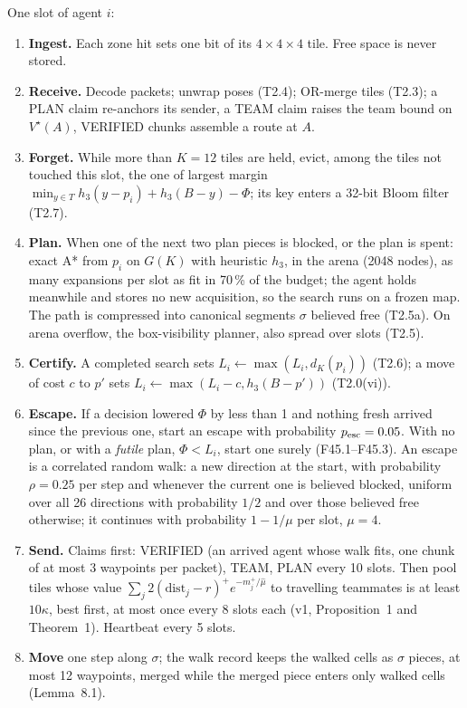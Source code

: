 \documentclass[11pt,a4paper]{article}
\newcommand{\Vs}{V^\star}
\begin{document}
One slot of agent $i$:
\begin{enumerate}\itemsep2pt
\item \textbf{Ingest.} Each zone hit sets one bit of its $4\times4\times4$ tile. Free space is never stored.
\item \textbf{Receive.} Decode packets; unwrap poses (T2.4); OR-merge tiles (T2.3); a PLAN claim re-anchors its
sender, a TEAM claim raises the team bound on $\Vs(A)$, VERIFIED chunks assemble a route at $A$.
\item \textbf{Forget.} While more than $K=12$ tiles are held, evict, among the tiles not touched this slot, the one of
largest margin $\min_{y\in T}h_3(y-p_i)+h_3(B-y)-\Phi$; its key enters a 32-bit Bloom filter (T2.7).
\item \textbf{Plan.} When one of the next two plan pieces is blocked, or the plan is spent: exact A* from $p_i$ on
$G(K)$ with heuristic $h_3$, in the arena (2048 nodes), as many expansions per slot as fit in 70\,\% of the budget; the
agent holds meanwhile and stores no new acquisition, so the search runs on a frozen map. The path is compressed into
canonical segments $\sigma$ believed free (T2.5a). On arena overflow, the box-visibility planner, also spread over slots
(T2.5).
\item \textbf{Certify.} A completed search sets $L_i\leftarrow\max(L_i,d_K(p_i))$ (T2.6); a move of cost $c$ to $p'$ sets
$L_i\leftarrow\max(L_i-c,h_3(B-p'))$ (T2.0(vi)).
\item \textbf{Escape.} If a decision lowered $\Phi$ by less than 1 and nothing fresh arrived since the previous one,
start an escape with probability $p_{\rm esc}=0.05$. With no plan, or with a \emph{futile} plan, $\Phi<L_i$, start
one surely (F45.1--F45.3). An escape is a correlated random walk: a new direction at the start, with probability
$\rho=0.25$ per step and whenever the current one is believed blocked, uniform over all 26 directions with probability
$1/2$ and over those believed free otherwise; it continues with probability $1-1/\mu$ per slot, $\mu=4$.
\item \textbf{Send.} Claims first: VERIFIED (an arrived agent whose walk fits, one chunk of at most 3 waypoints per
packet), TEAM, PLAN every 10 slots. Then pool tiles whose value
$\sum_j2(\mathrm{dist}_j-r)^+e^{-m_j^+/\hat\mu}$ to travelling teammates is at least $10\kappa$, best first, at most once
every 8 slots each (v1, Proposition~1 and Theorem~1). Heartbeat every 5 slots.
\item \textbf{Move} one step along $\sigma$; the walk record keeps the walked cells as $\sigma$ pieces, at most 12
waypoints, merged while the merged piece enters only walked cells (Lemma~8.1).
\end{enumerate}
\end{document}
